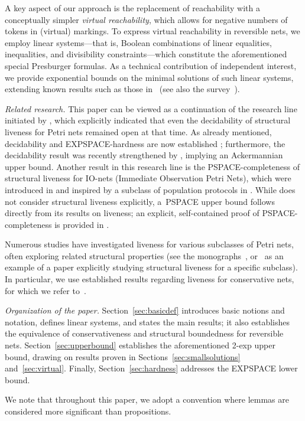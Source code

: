A key aspect of our approach is the replacement of
reachability with a conceptually simpler \emph{virtual reachability},
which allows for negative numbers of tokens in (virtual) markings. To
express virtual reachability in reversible nets, we employ linear
systems---that  is, Boolean combinations of linear equalities,
inequalities, and
divisibility constraints---which constitute the aforementioned
special
Presburger formulas. As a technical contribution of independent
interest, we provide exponential bounds on the minimal solutions of
such linear systems, extending known results such as those
in~\cite{DBLP:conf/rta/Pottier91} (see also the survey~\cite{DBLP:journals/siglog/Haase18}).




\emph{Related research.}
This paper can be viewed as a continuation of the research line
initiated by \cite{DBLP:journals/ipl/BestE16}, which explicitly
indicated that even the decidability of structural liveness for Petri
nets remained open at that time. As already mentioned, decidability
and EXPSPACE-hardness are now established
\cite{DBLP:journals/acta/JancarP19}; furthermore, the decidability
result was recently strengthened by \cite{DBLP:conf/concur/JancarL23,
DBLP:journals/lmcs/JancarL24}, implying an Ackermannian upper bound.
Another result in this research line is the PSPACE-completeness of
structural liveness for IO-nets (Immediate Observation Petri Nets),
which were introduced in \cite{DBLP:conf/apn/EsparzaRW19} and inspired
by a subclass of population protocols in
\cite{DBLP:journals/dc/AngluinAER07}. While
\cite{DBLP:conf/apn/EsparzaRW19} does not consider structural liveness
explicitly, a~PSPACE upper bound follows directly from its results on liveness; an explicit, self-contained proof of PSPACE-completeness is provided in \cite{DBLP:journals/fuin/JancarV22}.


Numerous studies have investigated liveness for various subclasses of
Petri nets, often exploring related structural properties (see
the monographs~\cite{reisig2013, BestDevillers2024,
desel_esparza_1995}, or~\cite{DBLP:journals/fuin/HujsaD18} as 
an example of a paper explicitly studying structural liveness 
for a specific subclass). In particular, we use established results
regarding liveness for conservative nets, for which we refer to~\cite{DBLP:conf/apn/MayrW14}.




\emph{Organization of the paper.} 
Section~\ref{sec:basicdef} introduces basic notions and notation,
defines linear systems, 
and states the main results; it also establishes the equivalence of conservativeness and structural boundedness for reversible nets. Section~\ref{sec:upperbound} establishes the aforementioned 2-exp upper bound, drawing on results proven in Sections~\ref{sec:smallsolutions} and~\ref{sec:virtual}. Finally, Section~\ref{sec:hardness} addresses the EXPSPACE lower bound.

We note that throughout this paper, we adopt a convention where lemmas are considered more significant than propositions.
